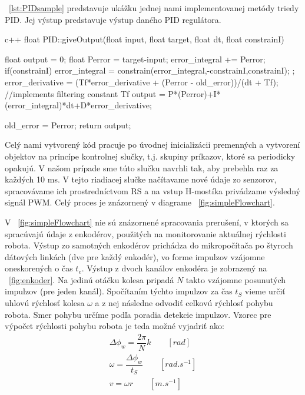\listingname~\ref{lst:PIDsample} predstavuje ukážku jednej nami implementovanej metódy triedy PID. Jej výstup predstavuje výstup daného PID regulátora.  


\begin{inlinecode}[label={lst:PIDsample},caption={Príklad jednej z metód triedy PID}]{c++}
float PID::giveOutput(float input, float target, float dt, float constrainI){
    float output  = 0;
    float Perror = target-input;
    error_integral += Perror;
    if(constrainI){
        error_integral = constrain(error_integral,-constrainI,constrainI);
    };
    error_derivative = (Tf*error_derivative + (Perror - old_error))/(dt + Tf);       //implements filtering constant Tf
    output = P*(Perror)+I*(error_integral)*dt+D*error_derivative;

    old_error = Perror;
    return output;
}
\end{inlinecode}

Celý nami vytvorený kód pracuje po úvodnej inicializácii premenných a vytvorení objektov na princípe kontrolnej slučky, t.j. skupiny príkazov, ktoré sa periodicky opakujú. V našom prípade sme túto slučku navrhli tak, aby prebehla raz za každých 10 ms. V tejto riadiacej slučke načítavame nové údaje zo senzorov, spracovávame ich prostredníctvom \ac{RS} a na vstup H-mostíka privádzame výsledný signál \ac{PWM}. Celý proces je znázornený v diagrame \figurename~\ref{fig:simpleFlowchart}.

V \figurename~\ref{fig:simpleFlowchart} nie sú znázornené spracovania prerušení, v ktorých sa spracúvajú údaje z enkodérov, použitých na monitorovanie aktuálnej rýchlosti robota. Výstup zo samotných enkodérov prichádza do mikropočítača po štyroch dátových linkách (dve pre každý enkodér), vo forme impulzov vzájomne oneskorených o čas $t_e$. Výstup z dvoch kanálov enkodéra je zobrazený na \figurename~\ref{fig:enkoder}. Na jedinú otáčku kolesa pripadá $N$ takto vzájomne posunutých impulzov (pre jeden kanál). Spočítaním týchto impulzov za čas  $t_S$ vieme určiť uhlovú rýchlosť kolesa $\omega$ a z nej následne odvodiť celkovú rýchlosť pohybu robota. Smer pohybu určíme podľa poradia detekcie impulzov. Vzorec pre výpočet rýchlosti pohybu robota je teda možné vyjadriť ako:
\begin{equation}
\begin{gathered}
\Delta\phi_w = \dfrac{2\pi}{N}k \qquad [rad] \\
\omega = \dfrac{\Delta\phi_w}{t_S} \qquad [rad.s^{-1}]\\
v = \omega r \qquad[m.s^{-1}]
\end{gathered}
\label{eq:speedEq}
\end{equation}


